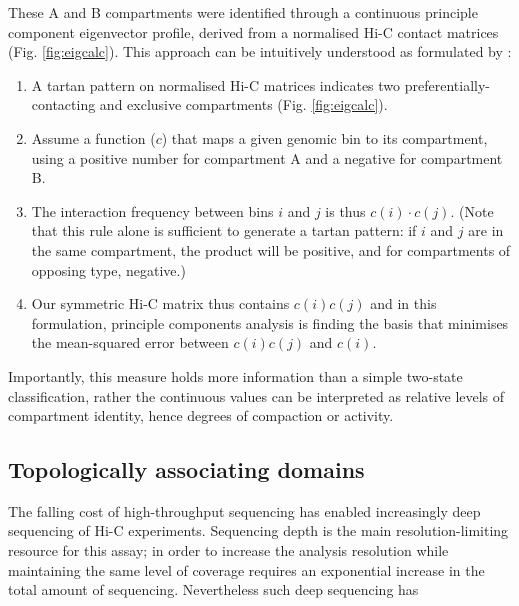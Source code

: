\documentclass[a4paper,11pt,oneside]{book}
\begin{document}
These A and B  compartments were identified through a continuous principle component eigenvector profile, derived from a normalised Hi-C contact matrices\cite{Lieberman2009} (Fig. \ref{fig:eigcalc}). This approach can be intuitively understood as formulated by \citet{Lajoie2014}:
\begin{enumerate}
\item A tartan pattern on normalised Hi-C matrices indicates two preferentially-contacting and exclusive compartments (Fig. \ref{fig:eigcalc}).
\item Assume a function ($c$) that maps a given genomic bin to its compartment, using a positive number for compartment A and a negative for compartment B.
\item The interaction frequency between bins $i$ and $j$ is thus $c(i)\cdot c(j)$. (Note that this rule alone is sufficient to generate a tartan pattern: if $i$ and $j$ are in the same compartment, the product will be positive, and for compartments of opposing type, negative.\cite{Lajoie2014})
\item Our symmetric Hi-C matrix thus contains $c(i)c(j)$ and in this formulation, principle components analysis is finding the basis that minimises the mean-squared error between $c(i)c(j)$ and $c(i)$.
\end{enumerate}
Importantly, this measure holds more information than a simple two-state classification, rather the continuous values can be interpreted as relative levels of compartment identity, hence degrees of compaction or activity.\cite{Dekker2013, Imakaev2012}

\subsection{Topologically associating domains}\label{intro:tads}

The falling cost of high-throughput sequencing has enabled increasingly deep sequencing of Hi-C experiments. Sequencing depth is the main resolution-limiting resource for this assay; in order to increase the analysis resolution while maintaining the same level of coverage requires an exponential increase in the total amount of sequencing.\cite{Lieberman2009, Tanay2013} Nevertheless such deep sequencing has 
\end{document}
